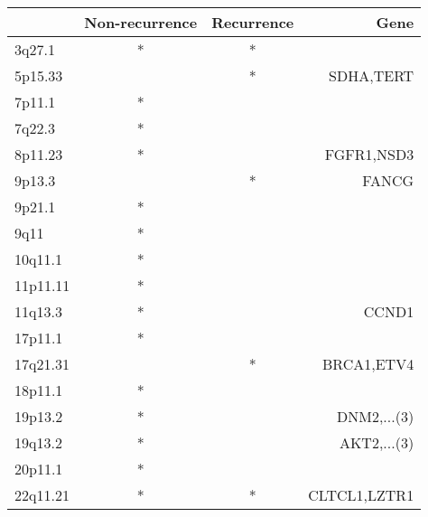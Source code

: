\begin{tabular}{lccr}
\toprule
{} & Non-recurrence & Recurrence &          Gene \\
\midrule
3q27.1   &              * &          * &               \\
5p15.33  &                &          * &     SDHA,TERT \\
7p11.1   &              * &            &               \\
7q22.3   &              * &            &               \\
8p11.23  &              * &            &    FGFR1,NSD3 \\
9p13.3   &                &          * &         FANCG \\
9p21.1   &              * &            &               \\
9q11     &              * &            &               \\
10q11.1  &              * &            &               \\
11p11.11 &              * &            &               \\
11q13.3  &              * &            &         CCND1 \\
17p11.1  &              * &            &               \\
17q21.31 &                &          * &    BRCA1,ETV4 \\
18p11.1  &              * &            &               \\
19p13.2  &              * &            &   DNM2,...(3) \\
19q13.2  &              * &            &   AKT2,...(3) \\
20p11.1  &              * &            &               \\
22q11.21 &              * &          * &  CLTCL1,LZTR1 \\
\bottomrule
\end{tabular}
